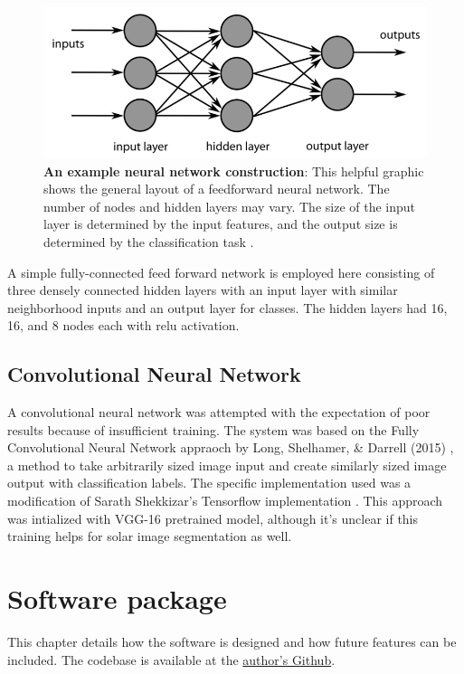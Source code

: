 \documentclass[twoside]{report}
\begin{document}
\begin{figure}[ht]
  \begin{center}
    \includegraphics[scale=0.5]{ffneural}
    \caption{{\bf An example neural network construction}: This helpful graphic shows the general layout of a feedforward neural network. The number of nodes and hidden layers may vary. The size of the input layer is determined by the input features, and the output size is determined by the classification task \cite{neuralexample}.}
 \end{center}
\end{figure}

A simple fully-connected feed forward network is employed here consisting of three densely connected hidden layers with an input layer with similar neighborhood inputs and an output layer for classes. The hidden layers had 16, 16, and 8 nodes each with relu activation. 

\section{Convolutional Neural Network}
A convolutional neural network was attempted with the expectation of poor results because of insufficient training. The system was based on the Fully Convolutional Neural Network appraoch by Long, Shelhamer, \& Darrell (2015) \cite{fcnn}, a method to take arbitrarily sized image input and create similarly sized image output with classification labels. The specific implementation used was a modification of Sarath Shekkizar's Tensorflow implementation \cite{fcnntensorflow}. This approach was intialized with VGG-16 pretrained model, although it's unclear if this training helps for solar image segmentation as well.

\chapter{Software package} 

This chapter details how the software is designed and how future features can be included. The codebase is available at the \href{https://github.com/jmbhughes/smachy}{author's Github}. 
\end{document}
